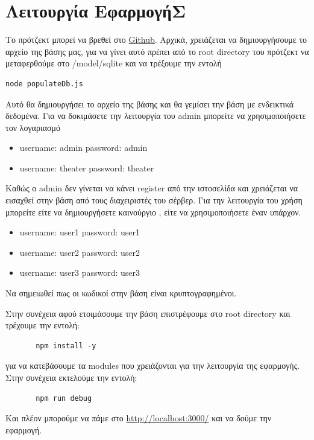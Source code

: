 \documentclass{acmart}
\begin{document}
\section{Λειτουργία ΕφαρμογήΣ}
Το πρότζεκτ μπορεί να βρεθεί στο \href{https://github.com/KonstantoJr/web_dev_project}{Github}.
Αρχικά, χρειάζεται να δημιουργήσουμε το αρχείο της βάσης μας, για να γίνει αυτό πρέπει από το root directory
του πρότζεκτ να μεταφερθούμε στο /model/sqlite και να τρέξουμε την εντολή 
\begin{lstlisting}
node populateDb.js 
\end{lstlisting}
Αυτό θα δημιουργήσει το αρχείο της βάσης και θα γεμίσει την βάση με ενδεικτικά δεδομένα.
Για να δοκιμάσετε την λειτουργία του admin μπορείτε να χρησιμοποιήσετε τον λογαριασμό 
\begin{itemize}
       \item username: admin password: admin
       \item username: theater password: theater
\end{itemize}
Καθώς ο admin δεν γίνεται να κάνει register από την ιστοσελίδα και χρειάζεται να εισαχθεί στην βάση από τους 
διαχειριστές του σέρβερ.
Για την λειτουργία του χρήση μπορείτε είτε να δημιουργήσετε καινούργιο , είτε να χρησιμοποιήσετε έναν υπάρχον.
\begin{itemize}
       \item username: user1 password: user1
       \item username: user2 password: user2
       \item username: user3 password: user3     
\end{itemize}
Να σημειωθεί πως οι κωδικοί στην βάση είναι κρυπτογραφημένοι.

Στην συνέχεια αφού ετοιμάσουμε την βάση επιστρέφουμε στο root directory και τρέχουμε την εντολή:
\begin{lstlisting}
       npm install -y 
\end{lstlisting}
για να κατεβάσουμε τα modules που χρειάζονται για την λειτουργία της εφαρμογής.
Στην συνέχεια εκτελούμε την εντολή:
\begin{lstlisting}
       npm run debug
\end{lstlisting}
Και πλέον μπορούμε να πάμε στο \url{http://localhost:3000/} και να δούμε την εφαρμογή.
\end{document}

